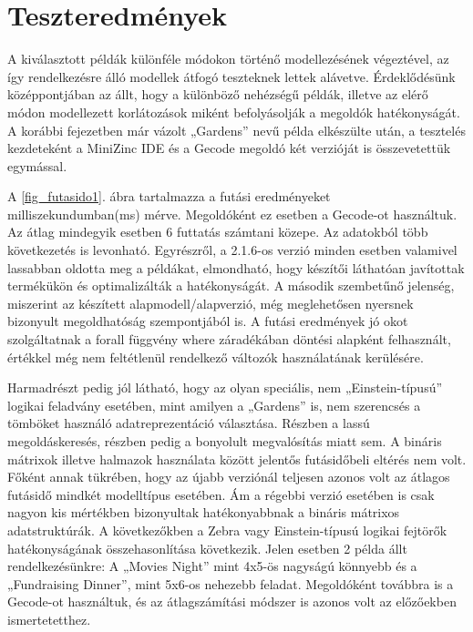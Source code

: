 \documentclass[12pt,a4paper,twoside, openright]{report}
\begin{document}
\section{Teszteredmények}

    A kiválasztott példák különféle módokon történő modellezésének végeztével, az így rendelkezésre álló modellek átfogó teszteknek lettek alávetve.
    Érdeklődésünk középpontjában az állt, hogy a különböző nehézségű példák, illetve az elérő módon modellezett korlátozások miként befolyásolják a megoldók hatékonyságát.
    A korábbi fejezetben már vázolt „Gardens” nevű példa elkészülte után, a tesztelés kezdeteként a MiniZinc IDE és a Gecode megoldó két verzióját is összevetettük egymással.


    A \ref{fig_futasido1}. ábra tartalmazza a futási eredményeket milliszekundumban(ms) mérve.
    Megoldóként ez esetben a Gecode-ot használtuk.
    Az átlag mindegyik esetben 6 futtatás számtani közepe.
    Az adatokból több következetés is levonható.
    Egyrészről, a 2.1.6-os verzió minden esetben valamivel lassabban oldotta meg a példákat, elmondható, hogy készítői láthatóan javítottak termékükön és optimalizálták a hatékonyságát.
    A második szembetűnő jelenség, miszerint az készített alapmodell/alapverzió, még meglehetősen nyersnek bizonyult megoldhatóság szempontjából is.
    A futási eredmények jó okot szolgáltatnak a forall függvény where záradékában döntési alapként felhasznált, értékkel még nem feltétlenül rendelkező változók használatának kerülésére.

    Harmadrészt pedig jól látható, hogy az olyan speciális, nem „Einstein-típusú” logikai feladvány esetében, mint amilyen a „Gardens” is, nem szerencsés a tömböket használó adatreprezentáció választása.
    Részben a lassú megoldáskeresés, részben pedig a bonyolult megvalósítás miatt sem.
    A bináris mátrixok illetve halmazok használata között jelentős futásidőbeli eltérés nem volt.
    Főként annak tükrében, hogy az újabb verziónál teljesen azonos volt az átlagos futásidő mindkét modelltípus esetében.
    Ám a régebbi verzió esetében is csak nagyon kis mértékben bizonyultak hatékonyabbnak a bináris mátrixos adatstruktúrák.
    A következőkben a Zebra vagy Einstein-típusú logikai fejtörők hatékonyságának 
    összehasonlítása következik.
    Jelen esetben 2 példa állt rendelkezésünkre: A „Movies 
    Night” mint 4x5-ös nagyságú könnyebb és a „Fundraising Dinner”, mint 5x6-os nehezebb 
    feladat.
    Megoldóként továbbra is a Gecode-ot használtuk, és az átlagszámítási módszer 
    is azonos volt az előzőekben ismertetetthez.
\end{document}
